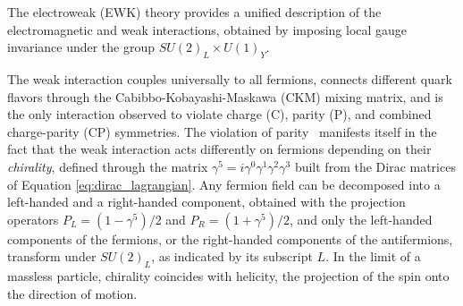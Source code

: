 The electroweak (EWK) theory provides a unified description of the electromagnetic and weak interactions, obtained by imposing local gauge invariance under the group $SU(2)_L \times U(1)_Y$. 

The weak interaction couples universally to all fermions, connects different quark flavors through the Cabibbo-Kobayashi-Maskawa (CKM) mixing matrix, and is the only interaction observed to violate charge (C), parity (P), and combined charge-parity (CP) symmetries. The violation of parity~\cite{Lee:1956qn,Wu:1957my} manifests itself in the fact that the weak interaction acts differently on fermions depending on their \textit{chirality}, defined through the matrix $\gamma^5 = i\gamma^0\gamma^1\gamma^2\gamma^3$ built from the Dirac matrices of Equation \ref{eq:dirac_lagrangian}. Any fermion field can be decomposed into a left-handed and a right-handed component, obtained with the projection operators $P_L = (1-\gamma^5)/2$ and $P_R = (1+\gamma^5)/2$, and only the left-handed components of the fermions, or the right-handed components of the antifermions, transform under $SU(2)_L$, as indicated by its subscript $L$. In the limit of a massless particle, chirality coincides with helicity, the projection of the spin onto the direction of motion.


